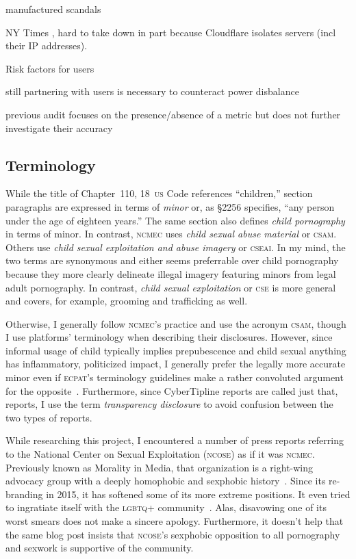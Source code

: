 \documentclass[nonacm,screen]{acmart}
\newcommand\V[1]{\textsc{\MakeLowercase{#1}}}
\begin{document}
{manufactured scandals \cite{Hitt2020,Masnick2017a}



NY Times \cite{KellerDance2019}, hard to take down \cite{Dance2019a} in
part because Cloudflare isolates servers (incl their IP addresses).



Risk factors for users   \cite{InsollOvaskaea2022}

still partnering with users is necessary to counteract power disbalance
\cite{Halavais2019}

previous audit focuses on the presence/absence of a metric but
does not further investigate their accuracy \cite{UrmanMakhortykh2023}


}


\subsection{Terminology}

While the title of Chapter~110, 18~\V{US} Code references ``children,'' section
paragraphs are expressed in terms of \emph{minor} or, as \S2256 specifies, ``any
person under the age of eighteen years.'' The same section also defines
\emph{child pornography} in terms of minor. In contrast, \V{NCMEC} uses
\emph{child sexual abuse material} or \V{CSAM}. Others use \emph{child sexual
exploitation and abuse imagery} or \V{CSEAI}. In my mind, the two terms are
synonymous and either seems preferrable over child pornography because they more
clearly delineate illegal imagery featuring minors from legal adult pornography.
In contrast, \emph{child sexual exploitation} or \V{CSE} is more general and
covers, for example, grooming and trafficking as well.

Otherwise, I generally follow \V{NCMEC}'s practice and use the acronym \V{CSAM},
though I use platforms' terminology when describing their disclosures. However,
since informal usage of child typically implies prepubescence and child sexual
anything has inflammatory, politicized impact, I generally prefer the legally
more accurate minor even if \V{ECPAT}'s terminology guidelines make a rather
convoluted argument for the opposite~\cite{GreijerDoek2016}. Furthermore, since
CyberTipline reports are called just that, reports, I use the term
\emph{transparency disclosure} to avoid confusion between the two types of
reports.

While researching this project, I encountered a number of press reports
referring to the National Center on Sexual Exploitation (\V{NCOSE}) as if it was
\V{NCMEC}. Previously known as Morality in Media, that organization is a
right-wing advocacy group with a deeply homophobic and sexphobic
history~\cite{WikipediaNCOSE}. Since its re-branding in 2015, it has softened
some of its more extreme positions. It even tried to ingratiate itself with the
\V{LGBTQ+} community~\cite{Hawkins2023a}. Alas, disavowing one of its worst
smears does not make a sincere apology. Furthermore, it doesn't help that the
same blog post insists that \V{NCOSE}'s sexphobic opposition to all pornography
and sexwork is supportive of the community.
\end{document}
